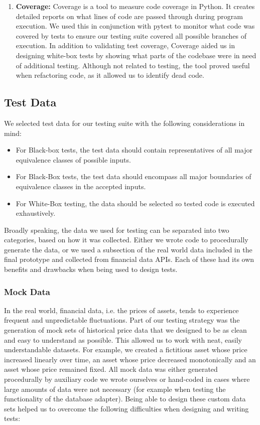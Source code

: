 \documentclass[main.tex]{subfiles}
\begin{document}
\begin{enumerate}
\item \textbf{Coverage:} Coverage \cite{coverage} is a tool to measure code coverage in Python. It creates detailed reports on what lines of code are passed through during program execution. We used this in conjunction with pytest to monitor what code was covered by tests to ensure our testing suite covered all possible branches of execution. In addition to validating test coverage, Coverage aided us in designing white-box tests by showing what parts of the codebase were in need of additional testing. Although not related to testing, the tool proved useful when refactoring code, as it allowed us to identify dead code.

\end{enumerate}


\subsection{Test Data}

We selected test data for our testing suite with the following considerations in mind:

\begin{itemize}

\item For Black-box tests, the test data should contain representatives of all major equivalence classes of possible inputs.
\item For Black-Box tests, the test data should encompass all major boundaries of equivalence classes in the accepted inputs.
\item For White-Box testing, the data should be selected so tested code is executed exhaustively.

\end{itemize}

Broadly speaking, the data we used for testing can be separated into two categories, based on how it was collected. Either we wrote code to procedurally generate the data, or we used a subsection of the real world data included in the final prototype and collected from financial data APIs. Each of these had its own benefits and drawbacks when being used to design tests.

\subsubsection{Mock Data}
In the real world, financial data, i.e. the prices of assets, tends to experience frequent and unpredictable fluctuations. Part of our testing strategy was the generation of mock sets of historical price data that we designed to be as clean and easy to understand as possible. This allowed us to work with neat, easily understandable datasets. For example, we created a fictitious asset whose price increased linearly over time, an asset whose price decreased monotonically and an asset whose price remained fixed. All mock data was either generated procedurally by auxiliary code we wrote ourselves or hand-coded in cases where large amounts of data were not necessary (for example when testing the functionality of the database adapter). Being able to design these custom data sets helped us to overcome the following difficulties when designing and writing tests:
\end{document}
